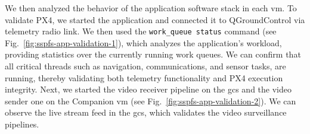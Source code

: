 We then analyzed the behavior of the application software stack in each
\gls{vm}.
To validate PX4, we started the application and connected it to QGroundControl
via telemetry radio link. We then used the \lstinline{work_queue status}
command (see Fig.~\ref{fig:sspfs-app-validation-1}), which analyzes the application's workload, providing statistics over
the currently running work queues. We can confirm that all critical threads such
as navigation, communications, and sensor tasks, are running, 
thereby validating both telemetry functionality and PX4 execution integrity.
%
Next, we started the video receiver pipeline on the \gls{gcs} and the video
sender one on the Companion \gls{vm} (see Fig.~\ref{fig:sspfs-app-validation-2}). We can
observe the live stream feed in the \gls{gcs}, which validates the video
surveillance pipelines.

